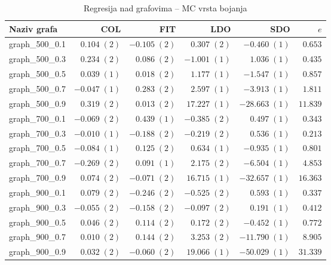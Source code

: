 \documentclass[times, utf8, diplomski, numeric]{fer}
\begin{document}
\begin{table}[htb]
	\caption{Regresija nad grafovima -- MC vrsta bojanja}
	\label{tbl:regresija-MC}
	\centering
	\begin{tabular}{|l|r|r|r|r|r|} \hline
	Naziv grafa & COL & FIT & LDO & SDO & $e$ \\ \hline \hline
graph\_500\_0.1 & $ 0.104\; (2) $ & $ -0.105\; (2) $ & $ 0.307\; (2) $ & $ -0.460\; (1) $ & $ 0.653 $\\ \hline
graph\_500\_0.3 & $ 0.234\; (2) $ & $ 0.086\; (2) $ & $ -1.001\; (1) $ & $ 1.036\; (1) $ & $ 0.435 $\\ \hline
graph\_500\_0.5 & $ 0.039\; (1) $ & $ 0.018\; (2) $ & $ 1.177\; (1) $ & $ -1.547\; (1) $ & $ 0.857 $\\ \hline
graph\_500\_0.7 & $ -0.047\; (1) $ & $ 0.283\; (2) $ & $ 2.597\; (1) $ & $ -3.913\; (1) $ & $ 1.811 $\\ \hline
graph\_500\_0.9 & $ 0.319\; (2) $ & $ 0.013\; (2) $ & $ 17.227\; (1) $ & $ -28.663\; (1) $ & $ 11.839 $\\ \hline
graph\_700\_0.1 & $ -0.069\; (2) $ & $ 0.439\; (1) $ & $ -0.385\; (2) $ & $ 0.497\; (1) $ & $ 0.343 $\\ \hline
graph\_700\_0.3 & $ -0.010\; (1) $ & $ -0.188\; (2) $ & $ -0.219\; (2) $ & $ 0.536\; (1) $ & $ 0.213 $\\ \hline
graph\_700\_0.5 & $ -0.084\; (1) $ & $ 0.125\; (2) $ & $ 0.634\; (1) $ & $ -0.935\; (1) $ & $ 0.801 $\\ \hline
graph\_700\_0.7 & $ -0.269\; (2) $ & $ 0.091\; (1) $ & $ 2.175\; (2) $ & $ -6.504\; (1) $ & $ 4.853 $\\ \hline
graph\_700\_0.9 & $ 0.074\; (2) $ & $ -0.071\; (2) $ & $ 16.715\; (1) $ & $ -32.657\; (1) $ & $ 16.363 $\\ \hline
graph\_900\_0.1 & $ 0.079\; (2) $ & $ -0.246\; (2) $ & $ -0.525\; (2) $ & $ 0.593\; (1) $ & $ 0.337 $\\ \hline
graph\_900\_0.3 & $ -0.055\; (2) $ & $ -0.158\; (2) $ & $ -0.097\; (2) $ & $ 0.191\; (1) $ & $ 0.412 $\\ \hline
graph\_900\_0.5 & $ 0.046\; (2) $ & $ 0.114\; (2) $ & $ 0.172\; (2) $ & $ -0.452\; (1) $ & $ 0.772 $\\ \hline
graph\_900\_0.7 & $ 0.010\; (2) $ & $ 0.144\; (2) $ & $ 3.253\; (2) $ & $ -11.790\; (1) $ & $ 8.905 $\\ \hline
graph\_900\_0.9 & $ 0.032\; (2) $ & $ -0.060\; (2) $ & $ 19.066\; (1) $ & $ -50.029\; (1) $ & $ 31.339 $\\ \hline
	\end{tabular}
\end{table} 
\end{document}
